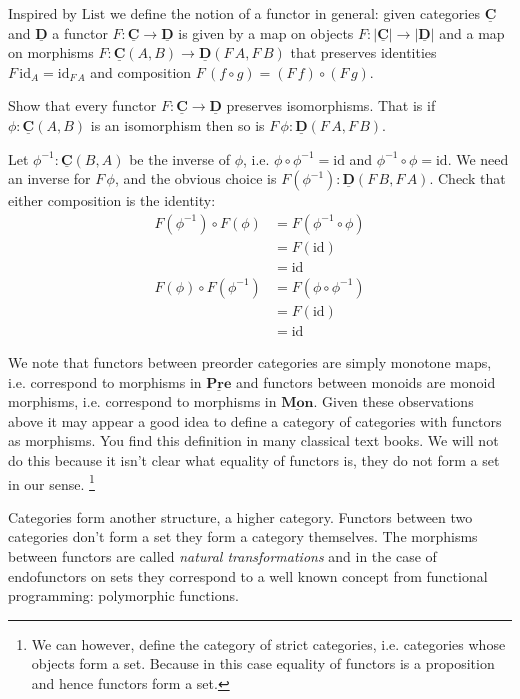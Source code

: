 \documentclass{article}
\newcommand{\cat}[1]{\underline{\mathbf{#1}}}
\newcommand{\obj}[1]{|#1|}
\newcommand{\homC}[3]{\cat{#1}(#2,#3)}
\newcommand{\id}{\mathrm{id}}
\newcommand{\List}{\mathrm{List}}
\newcommand{\inv}{^{-1}}
\begin{document}
Inspired by $\List$ we define the notion of a functor in general: given categories $\cat{C}$ and $\cat{D}$ a functor $F : \cat{C} \to \cat{D}$ is given by a map on objects $F : \obj{\cat{C}} \to \obj{\cat{D}}$ and a map on morphisms 
$F : \cat{C}(A,B) \to \cat{D}(F\,A,F\,B)$ that preserves identities $F\,\id_A = \id_{F\,A}$ and composition $F\,(f \circ g) = (F\,f) \circ (F\,g)$.

\begin{Exercise}
  Show that every functor $F\colon\cat{C}\to\cat{D}$ preserves isomorphisms. That is if $\phi : \homC{C}{A}{B}$ is an isomorphism then so is $F\,\phi : \homC{D}{F\,A}{F\,B}$.
\end{Exercise}
\begin{Answer}
  Let $\phi\inv:\homC{C}{B}{A}$ be the inverse of $\phi$, i.e. $\phi\circ\phi\inv=\id$ and $\phi\inv\circ\phi=\id$. We need an inverse for $F\,\phi$, and the obvious choice is $F(\phi\inv)\colon\homC{D}{F\,B}{F\,A}$. Check that either composition is the identity:
  \begin{align*}
    F(\phi\inv)\circ F(\phi)
      &= F(\phi\inv\circ\phi) \tag{functoriality}\\
      &= F(\id) \tag{assumed}\\
      &= \id \tag{functoriality}\\
    F(\phi)\circ F(\phi\inv)
      &= F(\phi\circ\phi\inv) \tag{functoriality}\\
      &= F(\id) \tag{assumed}\\
      &= \id \tag{functoriality}
  \end{align*}
\end{Answer}

We note that functors between preorder categories are simply monotone maps, i.e. correspond to morphisms in $\cat{Pre}$ and functors between monoids are monoid morphisms, i.e. correspond to morphisms in $\cat{Mon}$. Given these observations above it may appear a good idea to define a category of categories with functors as morphisms. You find this definition in many classical text books. We will not do this because it isn't clear what equality of functors is, they do not form a set in our sense.
\footnote{We can however, define the category of strict categories, i.e. categories whose objects form a set. Because in this case equality of functors is a proposition and hence functors form a set.}

Categories form another structure, a higher category. Functors between two categories don't form a set they form a category themselves.
The morphisms between functors are called \emph{natural transformations} and in the case of endofunctors on sets they correspond to a well known concept from functional programming: polymorphic functions. 
\end{document}
